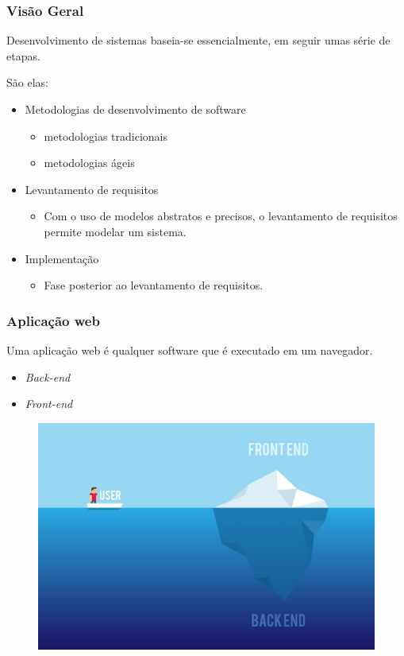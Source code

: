 \documentclass{beamer}
\begin{document}
	\begin{frame}\frametitle{Visão Geral}
		Desenvolvimento de sistemas baseia-se essencialmente, em seguir umas série de etapas.
		
		São elas:
		\begin{itemize}
			\item Metodologias de desenvolvimento de software
			\begin{itemize}
				\item metodologias tradicionais
				\item metodologias ágeis
			\end{itemize}
			\item Levantamento de requisitos
			\begin{itemize}
				\item Com o uso de modelos abstratos e precisos, o levantamento de requisitos permite modelar um sistema.
			\end{itemize}
			\item Implementação
			\begin{itemize}
				\item Fase posterior ao levantamento de requisitos.
			\end{itemize}	
		\end{itemize}
	\end{frame}


	\begin{frame}\frametitle{Aplicação web}
		Uma aplicação web é qualquer software que é executado em um navegador.
		\begin{itemize}
			\item \textit{Back-end}
			\item \textit{Front-end}
		\end{itemize}
		\begin{figure}[ht]
			\centering
			\includegraphics[scale=0.11]{img/front-back.jpg}
		\end{figure}
	\end{frame}
\end{document}
